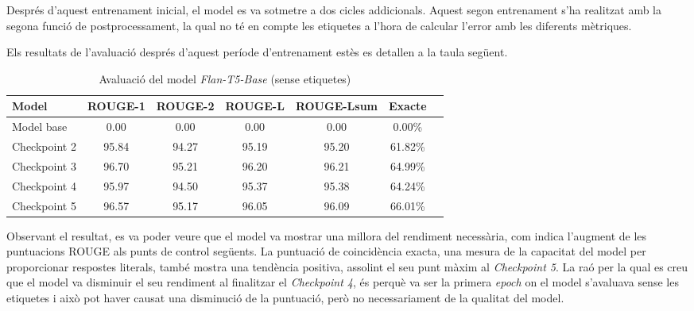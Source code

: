 Després d'aquest entrenament inicial, el model es va sotmetre a dos cicles addicionals. Aquest segon entrenament s'ha realitzat amb la segona funció de postprocessament, la qual no té en compte les etiquetes a l'hora de calcular l'error amb les diferents mètriques.

Els resultats de l'avaluació després d'aquest període d'entrenament estès es detallen a la taula següent.

\begin{table}[H]
    \centering
    \begin{tabular}{lcccccc}
    \toprule
    Model & ROUGE-1 & ROUGE-2 & ROUGE-L & ROUGE-Lsum & Exacte \\
    \midrule
    Model base   & 0.00  & 0.00  & 0.00  & 0.00  & 0.00\% \\
    Checkpoint 2 & 95.84 & 94.27 & 95.19 & 95.20 & 61.82\% \\
    Checkpoint 3 & 96.70 & 95.21 & 96.20 & 96.21 & 64.99\% \\
    Checkpoint 4 & 95.97 & 94.50 & 95.37 & 95.38 & 64.24\% \\
    Checkpoint 5 & 96.57 & 95.17 & 96.05 & 96.09 & 66.01\% \\
    \bottomrule
    \end{tabular}
    \caption[Avaluació del model \textit{Flan-T5-Base}]{Avaluació del model \textit{Flan-T5-Base} (sense etiquetes)}
\end{table}

Observant el resultat, es va poder veure que el model va mostrar una millora del rendiment necessària, com indica l'augment de les puntuacions ROUGE als punts de control següents. La puntuació de coincidència exacta, una mesura de la capacitat del model per proporcionar respostes literals, també mostra una tendència positiva, assolint el seu punt màxim al \textit{Checkpoint 5}. La raó per la qual es creu que el model va disminuir el seu rendiment al finalitzar el \textit{Checkpoint 4}, és perquè va ser la primera \textit{epoch} on el model s'avaluava sense les etiquetes i això pot haver causat una disminució de la puntuació, però no necessariament de la qualitat del model.






